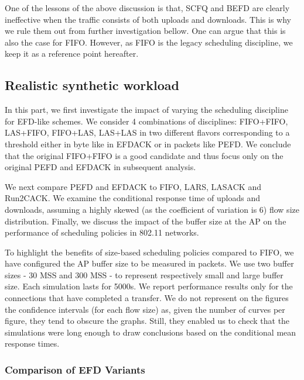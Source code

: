 \documentclass[preprint,12pt]{elsarticle}
\begin{document}
One of the lessons of the above discussion is that, SCFQ and BEFD are clearly ineffective when the traffic consists of both uploads and downloads. This is why we rule them out from further investigation bellow. One can argue that this is also the case for FIFO. However, as FIFO is the legacy scheduling discipline, we keep it as a reference point hereafter.

\subsection{Realistic synthetic workload} \label{section:realistic_workload}
In this part, we first investigate the impact of varying the scheduling discipline for EFD-like schemes. We consider 4 combinations of disciplines: FIFO+FIFO, LAS+FIFO, FIFO+LAS, LAS+LAS  in two different flavors corresponding to  a threshold either in byte like in EFDACK or in  packets like PEFD. We conclude that the original FIFO+FIFO is a good candidate and thus focus only on the original PEFD and EFDACK in subsequent analysis.

We next compare PEFD and EFDACK to FIFO, LARS, LASACK and Run2CACK.  We examine the conditional response time of uploads and downloads, assuming a highly skewed (as the coefficient of variation is 6) flow size distribution.  Finally, we discuss the impact of the buffer size at the AP on the performance of scheduling policies in 802.11 networks. 

To highlight the benefits of size-based scheduling policies compared to FIFO, we have configured the AP buffer size to be measured in packets. We use two buffer sizes - 30 MSS and 300 MSS - to represent respectively small and large buffer size. Each simulation lasts for 5000s. %
We report performance results only for the connections that have completed a transfer. We do not represent on the figures the confidence intervals  (for each flow size) as, given the number of curves per figure, they tend to obscure the graphs. Still, they enabled us to check that the simulations were long enough to draw conclusions based on the conditional mean response times. 

\subsubsection{Comparison of EFD Variants} \label{section:4schemes}
\end{document}
